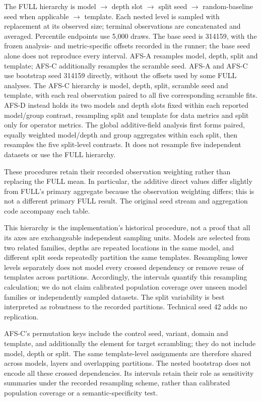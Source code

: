 The FULL hierarchy is model $\rightarrow$ depth slot $\rightarrow$ split seed $\rightarrow$ random-baseline seed when applicable $\rightarrow$ template. Each nested level is sampled with replacement at its observed size; terminal observations are concatenated and averaged. Percentile endpoints use 5,000 draws. The base seed is 314159, with the frozen analysis- and metric-specific offsets recorded in the runner; the base seed alone does not reproduce every interval. AFS-A resamples model, depth, split and template; AFS-C additionally resamples the scramble seed. AFS-A and AFS-C use bootstrap seed 314159 directly, without the offsets used by some FULL analyses. The AFS-C hierarchy is model, depth, split, scramble seed and template, with each real observation paired to all five corresponding scramble fits. AFS-D instead holds its two models and depth slots fixed within each reported model/group contrast, resampling split and template for data metrics and split only for operator metrics. The global additive-field analysis first forms paired, equally weighted model/depth and group aggregates within each split, then resamples the five split-level contrasts. It does not resample five independent datasets or use the FULL hierarchy.

These procedures retain their recorded observation weighting rather than replacing the FULL mean. In particular, the additive direct values differ slightly from FULL's primary aggregate because the observation weighting differs; this is not a different primary FULL result. The original seed stream and aggregation code accompany each table.

This hierarchy is the implementation's historical procedure, not a proof that all its axes are exchangeable independent sampling units. Models are selected from two related families, depths are repeated locations in the same model, and different split seeds repeatedly partition the same templates. Resampling lower levels separately does not model every crossed dependency or remove reuse of templates across partitions. Accordingly, the intervals quantify this resampling calculation; we do not claim calibrated population coverage over unseen model families or independently sampled datasets. The split variability is best interpreted as robustness to the recorded partitions. Technical seed 42 adds no replication.

AFS-C's permutation keys include the control seed, variant, domain and template, and additionally the element for target scrambling; they do not include model, depth or split. The same template-level assignments are therefore shared across models, layers and overlapping partitions. The nested bootstrap does not encode all these crossed dependencies. Its intervals retain their role as sensitivity summaries under the recorded resampling scheme, rather than calibrated population coverage or a semantic-specificity test.

